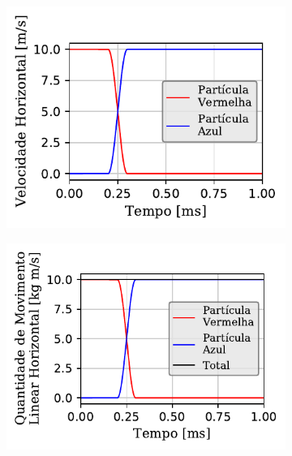\begin{figure}[H]
{\begin{subfigure}[t]{\smallresultsfigwidth}
			\caption{}
			\label{subfig:colliding_spheres:conservative:x_position}
		\end{subfigure}
		\begin{subfigure}[t]{\smallresultsfigwidth}
			\centering
			\includegraphics[scale=1]{images/colliding_spheres/conservative/Velocity-X_small.pdf}
			\caption{}
			\label{subfig:colliding_spheres:conservative:x_velocity}
		\end{subfigure}
		\begin{subfigure}[t]{\smallresultsfigwidth}
			\centering
			\includegraphics[scale=1]{images/colliding_spheres/conservative/linearMomentum-X_small_total.pdf}
			\caption{}
			\label{subfig:colliding_spheres:conservative:x_linear_momentum}
		\end{subfigure}
}
\end{figure}
